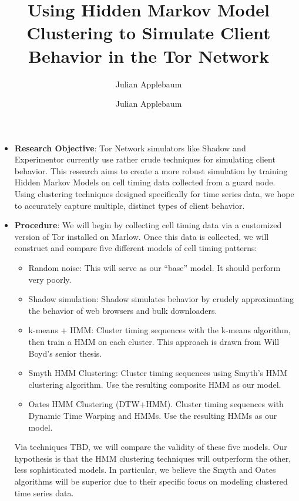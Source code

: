 \documentclass[12pt]{article}
\title{Using Hidden Markov Model Clustering to Simulate Client Behavior in the Tor Network}
\author{Julian Applebaum}
\author{Julian Applebaum}
\begin{document}
\maketitle

\begin{itemize}
\item{\textbf{Research Objective}: Tor Network simulators like Shadow and Experimentor currently use rather crude techniques for simulating client behavior. This research aims to create a more robust simulation by training Hidden Markov Models on cell timing data collected from a guard node. Using clustering techniques designed specifically for time series data, we hope to accurately capture multiple, distinct types of client behavior.}
\item{\textbf{Procedure}: We will begin by collecting cell timing data via a customized version of Tor installed on Marlow. Once this data is collected, we will construct and compare five different models of cell timing patterns:
	\begin{itemize}
		\item{Random noise: This will serve as our ``base'' model. It should perform very poorly.}
		\item{Shadow simulation: Shadow simulates behavior by crudely approximating the behavior of web browsers and bulk downloaders. }
		\item{k-means + HMM: Cluster timing sequences with the k-means algorithm, then train a HMM on each cluster. This approach is drawn from Will Boyd's senior thesis.}
		\item{Smyth HMM Clustering: Cluster timing sequences using Smyth's HMM clustering algorithm. Use the resulting composite HMM as our model.}
		\item{Oates HMM Clustering (DTW+HMM). Cluster timing sequences with Dynamic Time Warping and HMMs. Use the resulting HMMs as our model.}
	\end{itemize}
Via techniques TBD, we will compare the validity of these five models. Our hypothesis is that the HMM clustering techniques will outperform the other, less sophisticated models. In particular, we believe the Smyth and Oates algorithms will be superior due to their specific focus on modeling clustered time series data.
}
\end{itemize}
\end{document}
